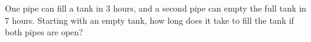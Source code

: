 One pipe can fill a tank in $3$ hours, and a second pipe can empty the full tank in $7$ hours. Starting with an empty tank, how long does it take to fill the tank if both pipes are open?

